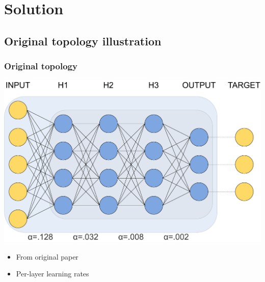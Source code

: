 \documentclass[pdf]{beamer}
\begin{document}
\section{Solution}

\subsection{Original topology illustration}
\begin{frame}
	\frametitle{Original topology}
	\begin{center}
		\includegraphics[width=.8\textwidth]{figures/basic_topology_illustration.pdf}
	\end{center}
	\begin{itemize}
		\item From original paper
		\item Per-layer learning rates
	\end{itemize}
\end{frame}
\end{document}
